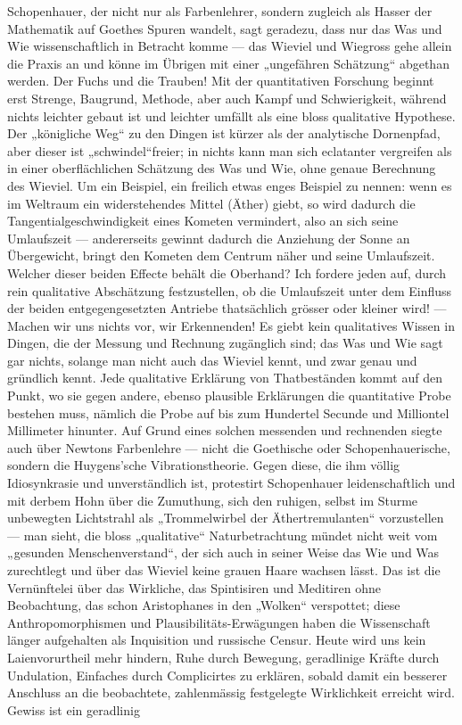 Schopenhauer, der nicht nur als Farbenlehrer, sondern zugleich als Hasser der Mathematik auf Goethes Spuren wandelt, sagt geradezu, dass nur das Was und Wie wissenschaftlich in Betracht komme — das Wieviel und Wiegross gehe allein die Praxis an und könne im Übrigen mit einer „ungefähren Schätzung“ abgethan werden. Der Fuchs und die Trauben! Mit der quantitativen Forschung beginnt erst Strenge, Baugrund, Methode, aber auch Kampf und Schwierigkeit, während nichts leichter gebaut ist und leichter umfällt als eine bloss qualitative Hypothese. Der „königliche Weg“ zu den Dingen ist kürzer als der analytische Dornenpfad, aber dieser ist „schwindel“freier; in nichts kann man sich eclatanter vergreifen als in einer oberflächlichen Schätzung des Was und Wie, ohne genaue Berechnung des Wieviel. Um ein Beispiel, ein freilich etwas enges Beispiel zu nennen: wenn es im Weltraum ein widerstehendes Mittel (Äther) giebt, so wird dadurch die Tangentialgeschwindigkeit eines Kometen vermindert, also an sich seine Umlaufszeit  — andererseits gewinnt dadurch die Anziehung der Sonne an Übergewicht, bringt den Kometen dem Centrum näher und  seine Umlaufszeit. Welcher dieser beiden Effecte behält die Oberhand? Ich fordere jeden  auf, durch rein qualitative Abschätzung festzustellen, ob die Umlaufszeit unter dem Einfluss der beiden entgegengesetzten Antriebe thatsächlich grösser oder kleiner wird! — Machen wir uns nichts vor, wir Erkennenden! Es giebt kein qualitatives Wissen in Dingen, die der Messung und Rechnung zugänglich sind; das Was und Wie sagt gar nichts, solange man nicht auch das Wieviel kennt, und zwar genau und gründlich kennt. Jede qualitative Erklärung von Thatbeständen kommt auf den Punkt, wo sie gegen andere, ebenso plausible Erklärungen die quantitative Probe bestehen muss, nämlich die Probe auf     bis zum Hundertel Secunde und Milliontel Millimeter hinunter. Auf Grund eines solchen messenden und rechnenden  siegte auch über Newtons Farbenlehre — nicht die Goethische oder Schopenhauerische, sondern die Huygens’sche Vibrationstheorie. Gegen diese, die ihm völlig Idiosynkrasie und unverständlich ist, protestirt Schopenhauer leidenschaftlich und mit derbem Hohn über die Zumuthung, sich den ruhigen, selbst im Sturme unbewegten Lichtstrahl als „Trommelwirbel der Äthertremulanten“ vorzustellen — man sieht, die bloss „qualitative“ Naturbetrachtung mündet nicht weit vom „gesunden Menschenverstand“, der sich auch in seiner Weise das Wie und Was zurechtlegt und über das Wieviel keine grauen Haare wachsen lässt. Das ist die Vernünftelei über das Wirkliche, das Spintisiren und Meditiren ohne Beobachtung, das schon Aristophanes in den „Wolken“ verspottet; diese Anthropomorphismen und Plausibilitäts-Erwägungen haben die Wissenschaft länger aufgehalten als Inquisition und russische Censur. Heute wird uns kein Laienvorurtheil mehr hindern, Ruhe durch Bewegung, geradlinige Kräfte durch Undulation, Einfaches durch Complicirtes zu erklären, sobald damit ein besserer Anschluss an die beobachtete, zahlenmässig festgelegte Wirklichkeit erreicht wird. Gewiss ist ein geradlinig 